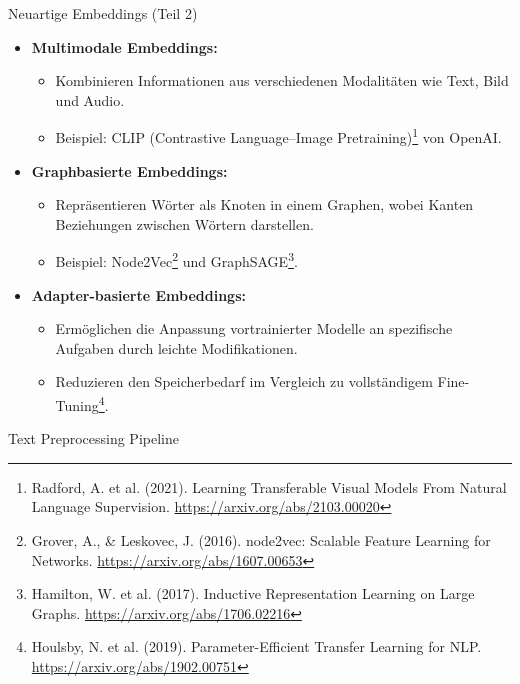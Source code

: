 \documentclass[aspectratio=1610, xcolor=dvipsnames, 9pt]{beamer}
\begin{document}
\begin{frame}{Neuartige Embeddings (Teil 2)}
  \begin{itemize}
    \item \textbf{Multimodale Embeddings:}
      \begin{itemize}
        \item Kombinieren Informationen aus verschiedenen Modalitäten wie Text, Bild und Audio.
        \item Beispiel: CLIP (Contrastive Language–Image Pretraining)\footnote{Radford, A. et al. (2021). Learning Transferable Visual Models From Natural Language Supervision. \url{https://arxiv.org/abs/2103.00020}} von OpenAI.
      \end{itemize}
    \item \textbf{Graphbasierte Embeddings:}
     \begin{itemize}
        \item Repräsentieren Wörter als Knoten in einem Graphen, wobei Kanten Beziehungen zwischen Wörtern darstellen.
        \item Beispiel: Node2Vec\footnote{Grover, A., \& Leskovec, J. (2016). node2vec: Scalable Feature Learning for Networks. \url{https://arxiv.org/abs/1607.00653}} und GraphSAGE\footnote{Hamilton, W. et al. (2017). Inductive Representation Learning on Large Graphs. \url{https://arxiv.org/abs/1706.02216}}.
      \end{itemize}
    \item \textbf{Adapter-basierte Embeddings:}
      \begin{itemize}
        \item Ermöglichen die Anpassung vortrainierter Modelle an spezifische Aufgaben durch leichte Modifikationen.
        \item Reduzieren den Speicherbedarf im Vergleich zu vollständigem Fine-Tuning\footnote{Houlsby, N. et al. (2019). Parameter-Efficient Transfer Learning for NLP. \url{https://arxiv.org/abs/1902.00751}}.
      \end{itemize}
  \end{itemize}
\end{frame}

\begin{frame}{Text Preprocessing Pipeline}
\end{frame}
\end{document}
